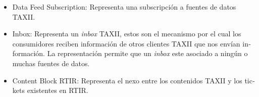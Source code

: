 \begin{itemize}
{	dichas fuentes de información para recibir datos que sean de su interés. }
\item \foreignlanguage{spanish}{Data Feed Subscription: Representa una subscripción a fuentes de datos TAXII.}
\item \foreignlanguage{spanish}{Inbox: Representa un }\foreignlanguage{spanish}{\textit{inbox
	}}\foreignlanguage{spanish}{TAXII, estos son el mecanismo por el cual los consumidores reciben información de otros
	clientes TAXII que nos envían información. La representación permite que un
}\foreignlanguage{spanish}{\textit{inbox}}\foreignlanguage{spanish}{ este asociado a ningún o muchas fuentes de datos.
}
\item \foreignlanguage{spanish}{Content Block RTIR: Representa el nexo entre los contenidos TAXII y los tickets
	existentes en RTIR.}
\end{itemize}